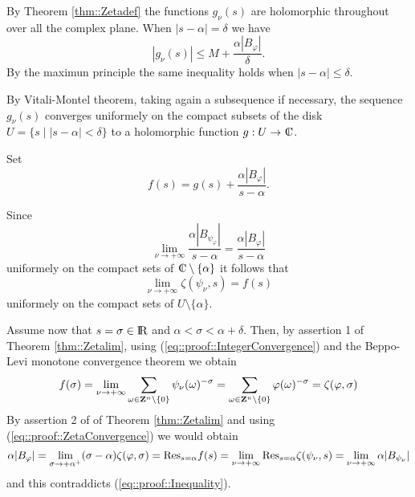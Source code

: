 \documentclass[12pt,a4paper]{amsart}
\begin{document}
{By Theorem \ref{thm::Zetadef}
the functions $g_{\nu}({s})$
are holomorphic throughout over all the complex plane.
When ${\left|{{s}-{\alpha}}\right|}=\delta$ we have
\begin{equation}
	{\left|{g_{\nu}({s})}\right|}\leq
	{M}+\frac{{\alpha}|{B}_{\varphi}|}{\delta}.
\end{equation}
By the maximun principle the same inequality holds when
${\left|{{s}-{\alpha}}\right|}\leq\delta$.

By Vitali-Montel theorem, taking again a subsequence if necessary,
the sequence $g_{\nu}({s})$
converges uniformely on the compact subsets of the disk
${U}=\{{s}\mid{\left|{{s}-{\alpha}}\right|}<\delta\}$
to a holomorphic function
$g:{U}\to{{\rm\kern.37em\vrule height1.4ex width.05em depth-.011em\kern-.37em C}}$.

Set
\begin{equation}\nonumber
f({s})=g({s})
	+\frac{{\alpha}|{B}_{\varphi}|}{{s}-{\alpha}}.
\end{equation}

Since
\begin{equation}\nonumber
\lim_{{\nu}\to+\infty}
	\frac{{\alpha}|{B}_{{\psi}_{\varphi}}|}{{s}-{\alpha}}
	=\frac{{\alpha}|{B}_{\varphi}|}{{s}-{\alpha}}
\end{equation}
uniformely on the compact sets of ${{\rm\kern.37em\vrule height1.4ex width.05em depth-.011em\kern-.37em C}}\setminus\{{\alpha}\}$
it follows that 
\begin{equation}\label{eq::proof::ZetaConvergence}
\lim_{{\nu}\to+\infty}
	{\zeta}({\psi}_{\nu},{s})
	=f({s})
\end{equation}
uniformely on the compact sets of ${U}\setminus\{{\alpha}\}$.

Assume now that ${s}={\sigma}\in{{\rm I\kern-.185em R}}$ and
${\alpha}<{\sigma}<{\alpha}+{\delta}$.
Then, by assertion 1 of Theorem \ref{thm::Zetalim},
using (\ref{eq::proof::IntegerConvergence}) and the
Beppo-Levi monotone convergence theorem we obtain
\begin{equation}\nonumber
	f({\sigma})
	
	=\lim_{{\nu}\to+\infty}\sum_{{\omega}\in{{\bf Z}}^{n}\setminus\{0\}}
			{\psi}_{\nu}({\omega})^{-{\sigma}}
	=\sum_{{\omega}\in{{\bf Z}}^{n}\setminus\{0\}}
			{\varphi}({\omega})^{-{\sigma}}
	={\zeta}({\varphi},{\sigma})
\end{equation}
By assertion 2 of of Theorem \ref{thm::Zetalim}
and using (\ref{eq::proof::ZetaConvergence}) we would obtain
\begin{equation}\nonumber
	{\alpha}|{B}_{\varphi}|
	=\lim_{\sigma\to+{\alpha}^+}
		(\sigma-{\alpha}){\zeta}({\varphi},\sigma)
	={\mathop{\rm Res}\limits}_{{s}={\alpha}}f({s})
	=\lim_{{\nu}\to+\infty}
		{\mathop{\rm Res}\limits}_{{s}={\alpha}}
			{\zeta}({\psi}_{\nu},{s})
	=\lim_{{\nu}\to+\infty}{\alpha}|{B}_{{\psi}_{\nu}}|
\end{equation}
and this contraddicts (\ref{eq::proof::Inequality}).

}
\end{document}
